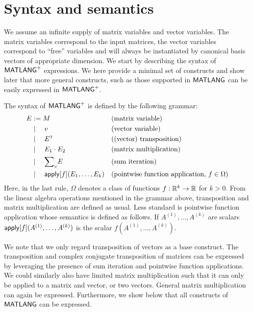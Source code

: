 \newpage 
\section{Syntax and semantics}
We assume an infinite supply of matrix variables and vector variables. The matrix variables  correspond to the input matrices, the vector variables
correspond to ``free'' variables and will always be instantiated by canonical basis vectors of appropriate dimension.
%
%
%
%
%
We start by describing  the syntax of  $\mathsf{MATLANG}^{\sf +}$ expressions. We here provide a minimal set of constructs and show later that more general constructs, such as those supported
in $\mathsf{MATLANG}$ can be easily expressed in $\mathsf{MATLANG}^{\sf +}$.  

The syntax of $\mathsf{MATLANG}^{\sf +}$ is defined by the following grammar:
\begin{align*}
	E&:=M && \text{(matrix variable)} \\
       &\mid\quad v &&\text{(vector variable)}\\
        &\mid\quad E^{\textsc{t}} &&\text{((vector) transposition)}\\
    &\mid\quad E_1 \cdot E_2 && \text{(matrix multiplication)} \\
	  &\mid\quad{\sum}_{v} E &&\text{(sum iteration)} \\
	      &\mid\quad \mathsf{apply}[f](E_1, \ldots, E_k) && \text{(pointwise function
    application, $f \in \Omega$)}
\end{align*}
Here, in the last rule, $\Omega$ denotes a class of functions $f:\mathbb{R}^k\to \mathbb{R}$ for $k>0$.  From the linear algebra operations mentioned in the grammar above, transposition and matrix multiplication are defined as usual. Less standard is  pointwise function application whose semantics is defined as follows. If $A^{(1)},\dots,A^{(k)}$ are scalars
$\mathsf{apply}[f](A^{(1)},\dots,A^{(k)})$ is the scalar $f(A^{(1)},\dots,A^{(k)})$.  

\begin{remark}
We note that we only regard transposition of vectors as a base construct. The transposition and complex conjugate transposition of matrices can be expressed by  leveraging the presence of sum iteration and pointwise function applications.
We could similarly also have limited matrix multiplication such that it can only be applied to a matrix and vector, or two vectors. General matrix multiplication can again be expressed. Furthermore, we show below that all constructs 
of $\mathsf{MATLANG}$ can be expressed.
\end{remark}

